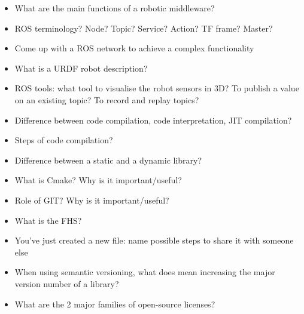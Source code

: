 \documentclass[compress]{beamer}
\begin{document}
\begin{frame}[plain]
    \begin{center}
        \begin{itemize}
        \item {What are the main functions of a robotic middleware?}
        \item {ROS terminology? Node? Topic? Service? Action? TF frame? Master?}
        \item {Come up with a ROS network to achieve a complex functionality}
        \item {What is a URDF robot description?}
        \item {ROS tools: what tool to visualise the robot sensors in 3D? To publish a value on an existing topic? To record and replay topics?}
        \end{itemize}
    \end{center}
\end{frame}

\begin{frame}[plain]
    \begin{center}
        \begin{itemize}
        \item {Difference between code compilation, code interpretation, JIT compilation?}
        \item {Steps of code compilation?}
        \item {Difference between a static and a dynamic library?}
        \item {What is Cmake? Why is it important/useful?}
        \item {Role of GIT? Why is it important/useful?}
        \item {What is the FHS?}
        \item {You’ve just created a new file: name possible steps to share it with someone else}
        \item {When using semantic versioning, what does mean increasing the major version number of a library?}
        \item {What are the 2 major families of open-source licenses?}
        \end{itemize}
    \end{center}
\end{frame}
\end{document}

